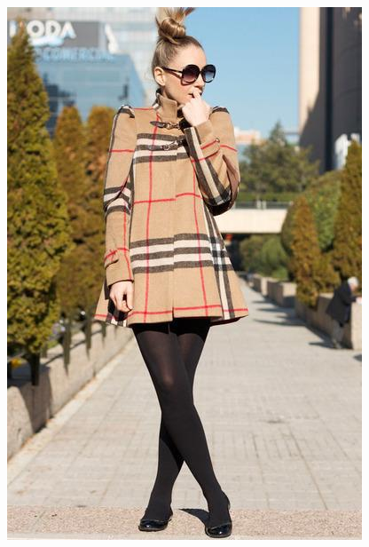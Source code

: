 \documentclass[12pt]{report}
\begin{document}
\begin{figure}
  \centering
  \begin{minipage}[b]{0.3\textwidth}
    \includegraphics[width=\textwidth]{images/resultados/299206original.jpg}

\end{minipage}
\end{figure}
\end{document}
